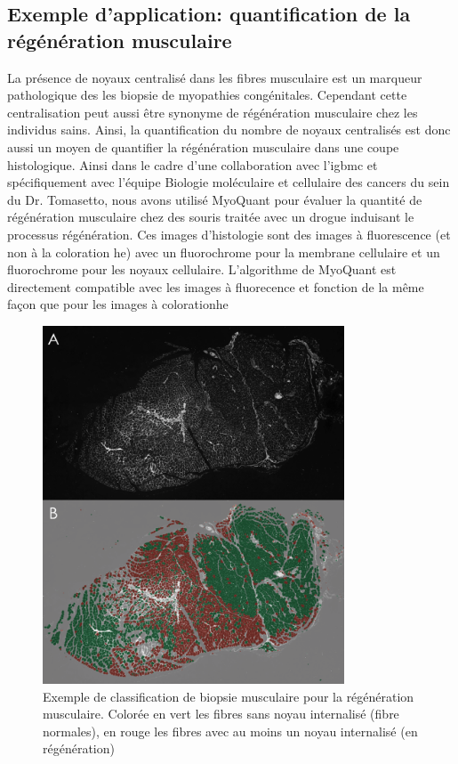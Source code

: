 \subsection{Exemple d'application: quantification de la régénération musculaire }
La présence de noyaux centralisé dans les fibres musculaire est un marqueur pathologique des les biopsie de myopathies congénitales. Cependant cette centralisation peut aussi être synonyme de régénération musculaire chez les individus sains. Ainsi, la quantification du nombre de noyaux centralisés est donc aussi un moyen de quantifier la régénération musculaire dans une coupe histologique. Ainsi dans le cadre d'une collaboration avec l'\gls{igbmc} et spécifiquement avec l'équipe Biologie moléculaire et cellulaire des cancers du sein du Dr. Tomasetto, nous avons utilisé MyoQuant pour évaluer la quantité de régénération musculaire chez des souris traitée avec un drogue induisant le processus régénération. Ces images d'histologie sont des images à fluorescence (et non à la coloration \gls{he}) avec un fluorochrome pour la membrane cellulaire et un fluorochrome pour les noyaux cellulaire. L'algorithme de MyoQuant est directement compatible avec les images à fluorecence et fonction de la même façon que pour les images à coloration\gls{he}
\begin{figure}[htbp]
 \centering
 \includegraphics[width=0.8\textwidth]{figures/fluo_nuc.png}
 \caption[Exemple de classification de biopsie musculaire pour la régénération musculaire]{Exemple de classification de biopsie musculaire pour la régénération musculaire. Colorée en vert les fibres sans noyau internalisé (fibre normales), en rouge les fibres avec au moins un noyau internalisé (en régénération)}
 \label{fig:fluo_paint}
\end{figure}

